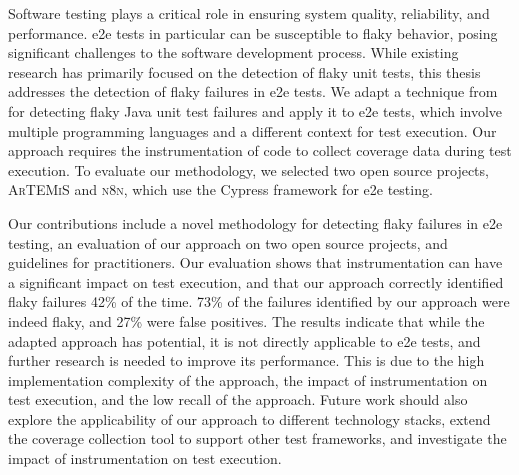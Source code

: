 
Software testing plays a critical role in ensuring system quality, reliability, and performance. 
\acf*{e2e} tests in particular can be susceptible to flaky behavior, posing significant challenges to the software development process. 
While existing research has primarily focused on the detection of flaky unit tests, this thesis addresses the detection of flaky failures in \acs*{e2e} tests. 
We adapt a technique from \citeauthor*{bell_deflaker_2018} for detecting flaky Java unit test failures and apply it to \acs*{e2e} tests, which involve multiple programming languages and a different context for test execution. Our approach requires the instrumentation of code to collect coverage data during test execution. 
To evaluate our methodology, we selected two open source projects, \textsc{ArTEMiS} and \textsc{n8n}, which use the Cypress framework for \acs*{e2e} testing.

Our contributions include a novel methodology for detecting flaky failures in \acs*{e2e} testing, an evaluation of our approach on two open source projects, and guidelines for practitioners. 
Our evaluation shows that instrumentation can have a significant impact on test execution, and that our approach correctly identified flaky failures 42\% of the time. 
73\% of the failures identified by our approach were indeed flaky, and 27\% were false positives.
The results indicate that while the adapted approach has potential, it is not directly applicable to \acs*{e2e} tests, and further research is needed to improve its performance. 
This is due to the high implementation complexity of the approach, the impact of instrumentation on test execution, and the low recall of the approach.
Future work should also explore the applicability of our approach to different technology stacks, extend the coverage collection tool to support other test frameworks, and investigate the impact of instrumentation on test execution.